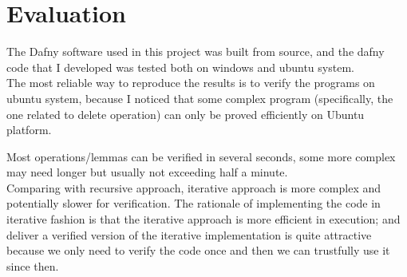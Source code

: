 \section*{Evaluation}
The Dafny software used in this project was built from source, and the dafny code that I developed was tested both on windows and ubuntu system.\\

The most reliable way to reproduce the results is to verify the programs on ubuntu system, because I noticed that some complex program (specifically, the one related to delete operation) can only be proved efficiently on Ubuntu platform.

\bigskip

Most operations/lemmas can be verified in several seconds, some more complex may need longer but usually not exceeding half a minute.\\

Comparing with recursive approach, iterative approach is more complex and potentially slower for verification. The rationale of implementing the code in iterative fashion is that the iterative approach is more efficient in execution; and deliver a verified version of the iterative implementation is quite attractive because we only need to verify the code once and then we can trustfully use it since then.
